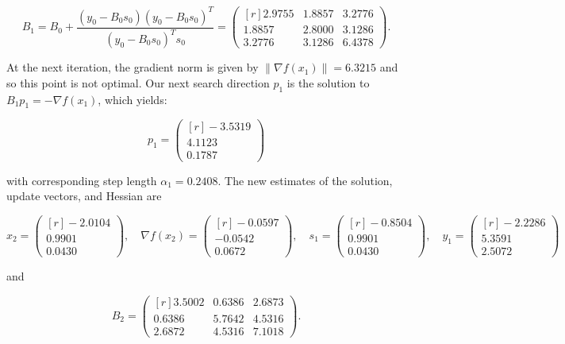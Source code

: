 \begin{solution}
    $$
    B_1 = B_0 + \frac{(y_0 - B_0 s_0)(y_0 - B_0 s_0)^T}{(y_0 - B_0 s_0)^T s_0} = \begin{pmatrix*}[r]
        2.9755 & 1.8857 & 3.2776 \\
        1.8857 & 2.8000 & 3.1286 \\
        3.2776 & 3.1286 & 6.4378
    \end{pmatrix*}.
    $$

    At the next iteration, the gradient norm is given by $\| \nabla f(x_1) \| = 6.3215$ and so this point is not 
    optimal. Our next search direction $p_1$ is the solution to $B_1 p_1 = -\nabla f(x_1)$, which yields:

    $$
    p_1 = \begin{pmatrix*}[r]
        -3.5319 \\
         4.1123 \\
         0.1787
    \end{pmatrix*}
    $$

    with corresponding step length $\alpha_1 = 0.2408$. The new estimates of the solution, update vectors, and Hessian 
    are

    $$
    x_2 = \begin{pmatrix*}[r]
        -2.0104 \\
         0.9901 \\
         0.0430
    \end{pmatrix*}, \quad \nabla f(x_2) = \begin{pmatrix*}[r]
        -0.0597 \\
        -0.0542 \\
         0.0672
    \end{pmatrix*}, \quad s_1 = \begin{pmatrix*}[r]
        -0.8504 \\
         0.9901 \\
         0.0430
    \end{pmatrix*}, \quad y_1 = \begin{pmatrix*}[r]
        -2.2286 \\
         5.3591 \\
         2.5072
    \end{pmatrix*}
    $$

    and 

    $$
    B_2 = \begin{pmatrix*}[r]
        3.5002 & 0.6386 & 2.6873 \\
        0.6386 & 5.7642 & 4.5316 \\
        2.6872 & 4.5316 & 7.1018
    \end{pmatrix*}.
    $$


\end{solution}
